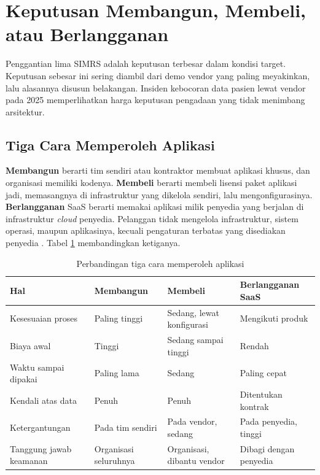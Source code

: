 \section{Keputusan Membangun, Membeli, atau Berlangganan}

Penggantian lima SIMRS adalah keputusan terbesar dalam kondisi target.
Keputusan sebesar ini sering diambil dari demo vendor yang paling meyakinkan,
lalu alasannya disusun belakangan. Insiden kebocoran data pasien lewat vendor
pada 2025 memperlihatkan harga keputusan pengadaan yang tidak menimbang
arsitektur.

\subsection*{Tiga Cara Memperoleh Aplikasi}

\textbf{Membangun} berarti tim sendiri atau kontraktor membuat aplikasi
khusus, dan organisasi memiliki kodenya. \textbf{Membeli} berarti membeli
lisensi paket aplikasi jadi, memasangnya di infrastruktur yang dikelola
sendiri, lalu mengonfigurasinya. \textbf{Berlangganan} SaaS berarti memakai
aplikasi milik penyedia yang berjalan di infrastruktur \textit{cloud}
penyedia. Pelanggan tidak mengelola infrastruktur, sistem operasi, maupun
aplikasinya, kecuali pengaturan terbatas yang disediakan penyedia
\cite{nist800-145}. Tabel \ref{tab:ch09-tiga-opsi} membandingkan
ketiganya.

\begin{table}[!htb]
  \centering
  \caption{Perbandingan tiga cara memperoleh aplikasi}
  \label{tab:ch09-tiga-opsi}
  \small
  \begin{tabularx}{\textwidth}{lXXX}
    \hline
    \textbf{Hal} & \textbf{Membangun} & \textbf{Membeli} & \textbf{Berlangganan SaaS} \\
    \hline
    Kesesuaian proses & Paling tinggi & Sedang, lewat konfigurasi & Mengikuti produk \\
    \hline
    Biaya awal & Tinggi & Sedang sampai tinggi & Rendah \\
    \hline
    Waktu sampai dipakai & Paling lama & Sedang & Paling cepat \\
    \hline
    Kendali atas data & Penuh & Penuh & Ditentukan kontrak \\
    \hline
    Ketergantungan & Pada tim sendiri & Pada vendor, sedang & Pada penyedia, tinggi \\
    \hline
    Tanggung jawab keamanan & Organisasi seluruhnya & Organisasi, dibantu vendor & Dibagi dengan penyedia \\
    \hline
  \end{tabularx}
\end{table}

